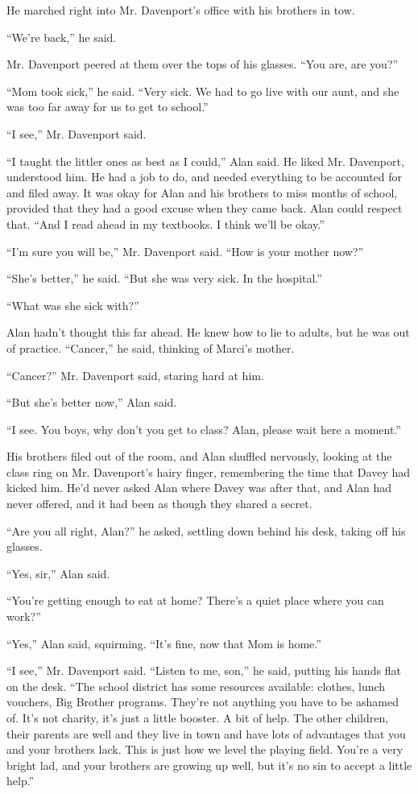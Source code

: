 \documentclass{article}
\begin{document}
He marched right into Mr.  Davenport's office with his brothers in
tow.

``We're back,'' he said.

Mr.  Davenport peered at them over the tops of his glasses.  ``You
are, are you?''

``Mom took sick,'' he said.  ``Very sick.  We had to go live with our
aunt, and she was too far away for us to get to school.''

``I see,'' Mr.  Davenport said.

``I taught the littler ones as best as I could,'' Alan said.  He liked
Mr.  Davenport, understood him.  He had a job to do, and needed
everything to be accounted for and filed away.  It was okay for Alan
and his brothers to miss months of school, provided that they had a
good excuse when they came back.  Alan could respect that.  ``And I
read ahead in my textbooks.  I think we'll be okay.''

``I'm sure you will be,'' Mr.  Davenport said.  ``How is your mother
now?''

``She's better,'' he said.  ``But she was very sick.  In the
hospital.''

``What was she sick with?''

Alan hadn't thought this far ahead.  He knew how to lie to adults, but
he was out of practice.  ``Cancer,'' he said, thinking of Marci's
mother.

``Cancer?'' Mr.  Davenport said, staring hard at him.

``But she's better now,'' Alan said.

``I see.  You boys, why don't you get to class?  Alan, please wait
here a moment.''

His brothers filed out of the room,  and Alan shuffled nervously,
looking at the class ring on Mr.  Davenport's hairy finger,
remembering the time that Davey had kicked him.  He'd never asked Alan
where Davey was after that, and Alan had never offered, and it had
been as though they shared a secret.

``Are you all right, Alan?'' he asked, settling down behind his desk,
taking off his glasses.

``Yes, sir,'' Alan said.

``You're getting enough to eat at home?  There's a quiet place where
you can work?''

``Yes,'' Alan said, squirming.  ``It's fine, now that Mom is home.''

``I see,'' Mr.  Davenport said.  ``Listen to me, son,'' he said,
putting his hands flat on the desk.  ``The school district has some
resources available:  clothes, lunch vouchers, Big Brother programs. 
They're not anything you have to be ashamed of.  It's not charity,
it's just a little booster.  A bit of help.  The other children, their
parents are well and they live in town and have lots of advantages
that you and your brothers lack.  This is just how we level the
playing field.  You're a very bright lad, and your brothers are
growing up well, but it's no sin to accept a little help.''
\end{document}
